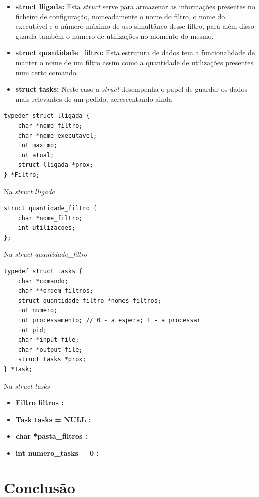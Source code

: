 \documentclass[11pt,a4paper]{report}
\begin{document}
\begin{itemize}
\item \textbf{struct lligada: } Esta \emph{struct} serve para armazenar as informações presentes no ficheiro de configuração, nomeadamente  o nome do filtro, o nome do executável e o número máximo de uso simultâneo desse filtro, para além disso guarda também o número de utilizações no momento do mesmo.
\item \textbf{struct quantidade\_filtro: } Esta estrutura de dados tem a funcionalidade de manter o nome de um filtro assim como a quantidade de utilizações presentes num certo comando.
\item \textbf{struct tasks: } Neste caso a \emph{struct} desempenha o papel de guardar os dados mais relevantes de um pedido, acrescentando ainda 
\end{itemize}

\begin{lstlisting}[style = code]
typedef struct lligada {
    char *nome_filtro;
    char *nome_executavel;
    int maximo;
    int atual;
    struct lligada *prox;
} *Filtro;
\end{lstlisting}

Na \emph{struct lligada}

\begin{lstlisting}[style = code]
struct quantidade_filtro {
    char *nome_filtro;
    int utilizacoes;
};
\end{lstlisting}

Na \emph{struct quantidade\_filtro}

\begin{lstlisting}[style = code]
typedef struct tasks {
    char *comando;
    char **ordem_filtros;
    struct quantidade_filtro *nomes_filtros;
    int numero;
    int processamento; // 0 - a espera; 1 - a processar
    int pid;
    char *input_file;
    char *output_file;
    struct tasks *prox;
} *Task;
\end{lstlisting}

Na \emph{struct tasks}

\begin{itemize}
\item \textbf{Filtro filtros :}
\item \textbf{Task tasks = NULL :}
\item \textbf{char *pasta\_filtros :}
\item \textbf{int numero\_tasks = 0 :}
\end{itemize}

\chapter{Conclusão}
\end{document}
